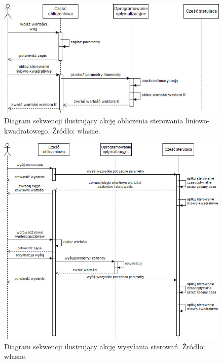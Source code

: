\begin{figure}[hpt]
    \centering
    \includegraphics[width=\textwidth]{Grafika/communication-lqr}
    \caption{Diagram sekwencji ilustrujący akcję obliczenia sterowania liniowo-kwadratowego. Źródło: własne.}\label{fig:comm-lqr}
\end{figure}

\begin{figure}[hpt]
    \centering
    \includegraphics[width=\textwidth]{Grafika/communication-between-levels}
    \caption{Diagram sekwencji ilustrujący akcję wysyłania sterowań. Źródło: własne.}\label{fig:comm-send}
\end{figure}